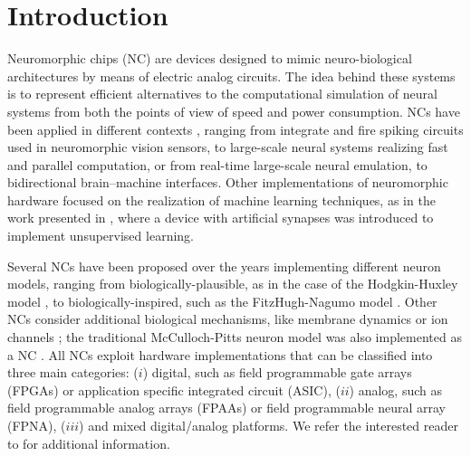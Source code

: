 \documentclass[utf8]{frontiersFPHY} %
\begin{document}
\section{Introduction}
Neuromorphic chips (NC) are devices designed to mimic neuro-biological architectures by means of electric analog circuits. 
The idea behind these systems is to represent efficient alternatives to the computational simulation of neural systems from both the points of view of speed and power consumption. 
NCs have been applied in different contexts \cite{indiveri2011neuromorphic}, ranging from integrate and fire spiking circuits used in neuromorphic vision sensors, to large-scale neural systems realizing fast and parallel computation, or from real-time large-scale neural emulation, to bidirectional brain–machine interfaces.
Other implementations of neuromorphic hardware focused on the realization of machine learning techniques, as in the work presented in \cite{covi2016analog}, where a device with artificial synapses was introduced to implement unsupervised learning.

Several NCs have been proposed over the years implementing different neuron models, ranging from biologically-plausible, as in the case of the Hodgkin-Huxley model \cite{hodgkin1952quantitative}, to biologically-inspired, such as the FitzHugh-Nagumo model \cite{binczak2006experimental}. 
Other NCs
consider additional biological mechanisms, like membrane dynamics \cite{arthur2006silicon} or ion channels \cite{basu2010nullcline}; the traditional McCulloch-Pitts neuron model was also implemented as a NC \cite{mcculloch1943logical}.
All NCs exploit hardware implementations that can be classified into three main categories: ($i$) digital, such as field programmable gate arrays (FPGAs) or application specific integrated circuit
(ASIC), ($ii$) analog, such as field programmable analog arrays (FPAAs) or field programmable neural array (FPNA), ($iii$) and mixed digital/analog platforms.
We refer the interested reader to \cite{schuman2017survey} for additional information. 
\end{document}

